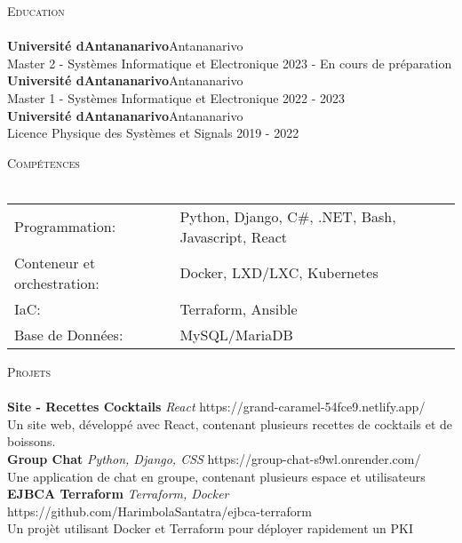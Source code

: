 \documentclass[a4paper]{article}
\newcommand{\lineunder} {
    \vspace*{-8pt} \\
    \hspace*{-18pt} \hrulefill \\
}
\newcommand{\header} [1] {
    {\hspace*{-18pt}\vspace*{6pt} \textsc{#1}}
    \vspace*{-6pt} \lineunder
}
\begin{document}
\header{Education}
\textbf{Université d\textquotesingle{}Antananarivo}\hfill Antananarivo\\
Master 2 - Systèmes Informatique et Electronique \hfill 2023 - En cours de préparation\\
\vspace{2mm}
\textbf{Université d\textquotesingle{}Antananarivo}\hfill Antananarivo\\
Master 1 - Systèmes Informatique et Electronique \hfill 2022 - 2023\\
\vspace{2mm}
\textbf{Université d\textquotesingle{}Antananarivo}\hfill Antananarivo\\
Licence Physique des Systèmes et Signals \hfill 2019 - 2022\\
\vspace{2mm}

\header{Compétences}
\begin{tabular}{ l l }
	Programmation:              & Python, Django, C\#, .NET, Bash, Javascript, React           \\
	Conteneur et orchestration: & Docker, LXD/LXC, Kubernetes \\
	IaC:                        & Terraform, Ansible          \\
	Base de Données:           & MySQL/MariaDB               \\
\end{tabular}
\vspace{2mm}

\header{Projets}
{\textbf{Site - Recettes Cocktails}} {\sl React} \hfill https://grand-caramel-54fce9.netlify.app/\\
Un site web, développé avec React, contenant plusieurs recettes de cocktails et de boissons.\\
\vspace*{2mm}
{\textbf{Group Chat}} {\sl Python, Django, CSS} \hfill https://group-chat-s9wl.onrender.com/\\
Une application de chat en groupe, contenant plusieurs espace et utilisateurs\\
\vspace*{2mm}
{\textbf{EJBCA Terraform}} {\sl Terraform, Docker} \hfill https://github.com/HarimbolaSantatra/ejbca-terraform\\
Un projèt utilisant Docker et Terraform pour déployer rapidement un PKI\\
\vspace*{2mm}



\ 
\end{document}
